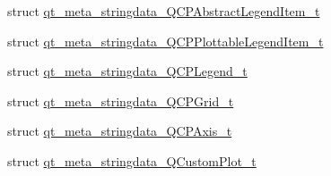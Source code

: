 \begin{DoxyCompactItemize}
\item 
struct \hyperlink{a00016_d1/d44/a00098}{qt\+\_\+meta\+\_\+stringdata\+\_\+\+Q\+C\+P\+Abstract\+Legend\+Item\+\_\+t}
\item 
struct \hyperlink{a00016_d4/d3e/a00116}{qt\+\_\+meta\+\_\+stringdata\+\_\+\+Q\+C\+P\+Plottable\+Legend\+Item\+\_\+t}
\item 
struct \hyperlink{a00016_d2/da3/a00115}{qt\+\_\+meta\+\_\+stringdata\+\_\+\+Q\+C\+P\+Legend\+\_\+t}
\item 
struct \hyperlink{a00016_d0/dc2/a00104}{qt\+\_\+meta\+\_\+stringdata\+\_\+\+Q\+C\+P\+Grid\+\_\+t}
\item 
struct \hyperlink{a00016_d0/d61/a00100}{qt\+\_\+meta\+\_\+stringdata\+\_\+\+Q\+C\+P\+Axis\+\_\+t}
\item 
struct \hyperlink{a00016_d8/d87/a00118}{qt\+\_\+meta\+\_\+stringdata\+\_\+\+Q\+Custom\+Plot\+\_\+t}
\end{DoxyCompactItemize}
